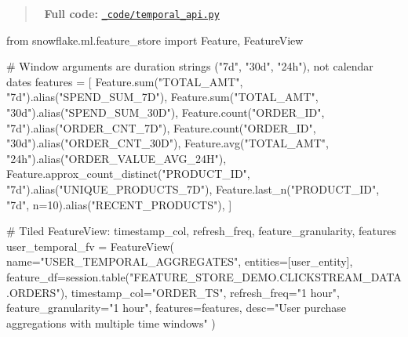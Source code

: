 \documentclass[
  letterpaper,
  DIV=11,
  numbers=noendperiod]{scrreprt}
\newenvironment{Shaded}{\begin{snugshade}}{\end{snugshade}}
\newcommand{\BuiltInTok}[1]{\textcolor[rgb]{0.00,0.23,0.31}{#1}}
\newcommand{\CommentTok}[1]{\textcolor[rgb]{0.37,0.37,0.37}{#1}}
\newcommand{\DecValTok}[1]{\textcolor[rgb]{0.68,0.00,0.00}{#1}}
\newcommand{\ImportTok}[1]{\textcolor[rgb]{0.00,0.46,0.62}{#1}}
\newcommand{\NormalTok}[1]{\textcolor[rgb]{0.00,0.23,0.31}{#1}}
\newcommand{\OperatorTok}[1]{\textcolor[rgb]{0.37,0.37,0.37}{#1}}
\newcommand{\StringTok}[1]{\textcolor[rgb]{0.13,0.47,0.30}{#1}}
\begin{document}
\begin{quote}
📁 \textbf{Full code:}
\href{_code/temporal_api.py}{\texttt{\_code/temporal\_api.py}}
\end{quote}

\begin{Shaded}
\begin{Highlighting}[]
\ImportTok{from}\NormalTok{ snowflake.ml.feature\_store }\ImportTok{import}\NormalTok{ Feature, FeatureView}

\CommentTok{\# Window arguments are duration strings ("7d", "30d", "24h"), not calendar dates}
\NormalTok{features }\OperatorTok{=}\NormalTok{ [}
\NormalTok{    Feature.}\BuiltInTok{sum}\NormalTok{(}\StringTok{"TOTAL\_AMT"}\NormalTok{, }\StringTok{"7d"}\NormalTok{).alias(}\StringTok{"SPEND\_SUM\_7D"}\NormalTok{),}
\NormalTok{    Feature.}\BuiltInTok{sum}\NormalTok{(}\StringTok{"TOTAL\_AMT"}\NormalTok{, }\StringTok{"30d"}\NormalTok{).alias(}\StringTok{"SPEND\_SUM\_30D"}\NormalTok{),}
\NormalTok{    Feature.count(}\StringTok{"ORDER\_ID"}\NormalTok{, }\StringTok{"7d"}\NormalTok{).alias(}\StringTok{"ORDER\_CNT\_7D"}\NormalTok{),}
\NormalTok{    Feature.count(}\StringTok{"ORDER\_ID"}\NormalTok{, }\StringTok{"30d"}\NormalTok{).alias(}\StringTok{"ORDER\_CNT\_30D"}\NormalTok{),}
\NormalTok{    Feature.avg(}\StringTok{"TOTAL\_AMT"}\NormalTok{, }\StringTok{"24h"}\NormalTok{).alias(}\StringTok{"ORDER\_VALUE\_AVG\_24H"}\NormalTok{),}
\NormalTok{    Feature.approx\_count\_distinct(}\StringTok{"PRODUCT\_ID"}\NormalTok{, }\StringTok{"7d"}\NormalTok{).alias(}\StringTok{"UNIQUE\_PRODUCTS\_7D"}\NormalTok{),}
\NormalTok{    Feature.last\_n(}\StringTok{"PRODUCT\_ID"}\NormalTok{, }\StringTok{"7d"}\NormalTok{, n}\OperatorTok{=}\DecValTok{10}\NormalTok{).alias(}\StringTok{"RECENT\_PRODUCTS"}\NormalTok{),}
\NormalTok{]}

\CommentTok{\# Tiled FeatureView: timestamp\_col, refresh\_freq, feature\_granularity, features}
\NormalTok{user\_temporal\_fv }\OperatorTok{=}\NormalTok{ FeatureView(}
\NormalTok{    name}\OperatorTok{=}\StringTok{"USER\_TEMPORAL\_AGGREGATES"}\NormalTok{,}
\NormalTok{    entities}\OperatorTok{=}\NormalTok{[user\_entity],}
\NormalTok{    feature\_df}\OperatorTok{=}\NormalTok{session.table(}\StringTok{"FEATURE\_STORE\_DEMO.CLICKSTREAM\_DATA.ORDERS"}\NormalTok{),}
\NormalTok{    timestamp\_col}\OperatorTok{=}\StringTok{"ORDER\_TS"}\NormalTok{,}
\NormalTok{    refresh\_freq}\OperatorTok{=}\StringTok{"1 hour"}\NormalTok{,}
\NormalTok{    feature\_granularity}\OperatorTok{=}\StringTok{"1 hour"}\NormalTok{,}
\NormalTok{    features}\OperatorTok{=}\NormalTok{features,}
\NormalTok{    desc}\OperatorTok{=}\StringTok{"User purchase aggregations with multiple time windows"}
\NormalTok{)}
\end{Highlighting}
\end{Shaded}
\end{document}
